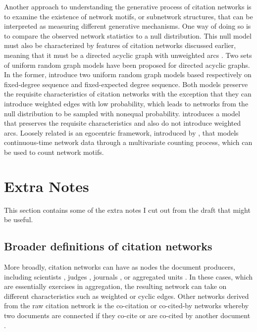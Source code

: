 \documentclass[headsepline=true, abstracton]{scrartcl}
\begin{document}
	Another approach to understanding the generative process of citation networks is to examine the existence of network motifs, or subnetwork structures, that can be interpreted as measuring different generative mechanisms. One way of doing so is to compare the observed network statistics to a null distribution. This null model must also be characterized by features of citation networks discussed earlier, meaning that it must be a directed acyclic graph with unweighted arcs \citep{carstens2016topology}. Two sets of uniform random graph models have been proposed for directed acyclic graphs. In the former, \citet{karrer2009random} introduce two uniform random graph models based respectively on fixed-degree sequence and fixed-expected degree sequence. Both models preserve the requisite characteristics of citation networks with the exception that they can introduce weighted edges with low probability, which leads to networks from the null distribution to be sampled with nonequal probability. \citet{carstens2014uniform,carstens2016topology} introduces a model that preserves the requisite characteristics and also do not introduce weighted arcs. Loosely related is an egocentric framework, introduced by \citet{vu2011dynamic}, that models continuous-time network data through a multivariate counting process, which can be used to count network motifs.
	
	\section{Extra Notes}
	This section contains some of the extra notes I cut out from the draft that might be useful.
	\subsection{Broader definitions of citation networks}
	More broadly, citation networks can have as nodes the document producers, including scientists \citep{ji2016coauthorship}, judges \citep{landes1998judicial}, journals \citep{rice1988citation}, or aggregated units \citep{gelter2012networks,pan2012world}. In these cases, which are essentially exercises in aggregation, the resulting network can take on different characteristics such as weighted or cyclic edges. Other networks derived from the raw citation network is the co-citation or co-cited-by networks whereby two documents are connected if they co-cite or are co-cited by another document \citep{van2005reference}.
	
\end{document}
